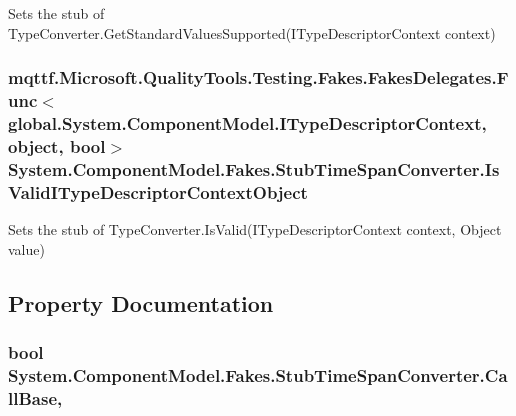 Sets the stub of Type\-Converter.\-Get\-Standard\-Values\-Supported(\-I\-Type\-Descriptor\-Context context)

\hypertarget{class_system_1_1_component_model_1_1_fakes_1_1_stub_time_span_converter_a4c21f653fe5ca52bf49642dc5b6aeef1}{
\subsubsection[{Is\-Valid\-I\-Type\-Descriptor\-Context\-Object}]{\setlength{\rightskip}{0pt plus 5cm}mqttf.\-Microsoft.\-Quality\-Tools.\-Testing.\-Fakes.\-Fakes\-Delegates.\-Func$<$global.\-System.\-Component\-Model.\-I\-Type\-Descriptor\-Context, object, bool$>$ System.\-Component\-Model.\-Fakes.\-Stub\-Time\-Span\-Converter.\-Is\-Valid\-I\-Type\-Descriptor\-Context\-Object}}\label{class_system_1_1_component_model_1_1_fakes_1_1_stub_time_span_converter_a4c21f653fe5ca52bf49642dc5b6aeef1}


Sets the stub of Type\-Converter.\-Is\-Valid(\-I\-Type\-Descriptor\-Context context, Object value)



\subsection{Property Documentation}
\hypertarget{class_system_1_1_component_model_1_1_fakes_1_1_stub_time_span_converter_a80820555cfcc31968d983e094905d120}{
\subsubsection[{Call\-Base}]{\setlength{\rightskip}{0pt plus 5cm}bool System.\-Component\-Model.\-Fakes.\-Stub\-Time\-Span\-Converter.\-Call\-Base\hspace{0.3cm}{\ttfamily [get]}, {\ttfamily [set]}}}\label{class_system_1_1_component_model_1_1_fakes_1_1_stub_time_span_converter_a80820555cfcc31968d983e094905d120}


